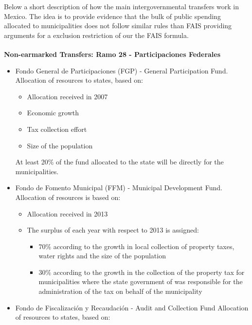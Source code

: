 \documentclass[dv_diss_main.tex]{subfiles}
\begin{document}
\label{intertransfer}

Below a short description of how the main intergovernmental transfers work in Mexico. The idea is to provide evidence that the bulk of public spending allocated to municipalities does not follow similar rules than FAIS providing arguments for a exclusion restriction of our the FAIS formula.
\\
\\
{\bf Non-earmarked Transfers: Ramo 28 - Participaciones Federales}

\begin{itemize}
    \item 	Fondo General de Participaciones (FGP) - General Participation Fund. Allocation of resources to states, based on:
    \begin{itemize}
        \item Allocation received in 2007
        \item Economic growth
        \item Tax collection effort
        \item Size of the population
    \end{itemize}
    
    At least 20\% of the fund allocated to the state will be directly for the municipalities.
    
    \item Fondo de Fomento Municipal (FFM) - Municipal Development Fund. Allocation of resources is based on:

    \begin{itemize}
        \item Allocation received in 2013
        \item The surplus of each year with respect to 2013 is assigned:
        \begin{itemize}
            \item 70\% according to the growth in local collection of property taxes, water rights and the size of the population
            \item 30\% according to the growth in the collection of the property tax for municipalities where the state government of was responsible for the administration of the tax on behalf of the municipality
        \end{itemize}
        
    \end{itemize}
    
    \item Fondo de Fiscalización y Recaudación - Audit and Collection Fund Allocation of resources to states, based on:
    

\end{itemize}
\end{document}
